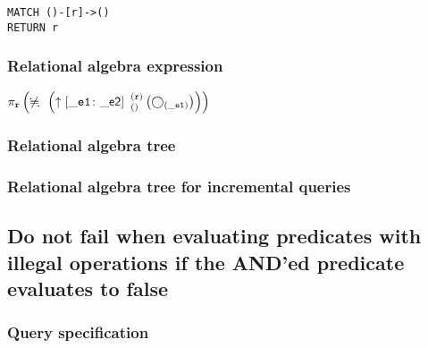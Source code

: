 \begin{lstlisting}
MATCH ()-[r]->()
RETURN r
\end{lstlisting}

\subsubsection*{Relational algebra expression}

$\projection{\var{r}} \left(\alldifferent{} \left(\expandout{\_e1}{\_e2}{}{r}{} \left(\getvertices{\_e1}{}\right)\right)\right)$

\subsubsection*{Relational algebra tree}


\subsubsection*{Relational algebra tree for incremental queries}


\subsection{Do not fail when evaluating predicates with illegal operations if the AND'ed predicate evaluates to false}

\subsubsection*{Query specification}

